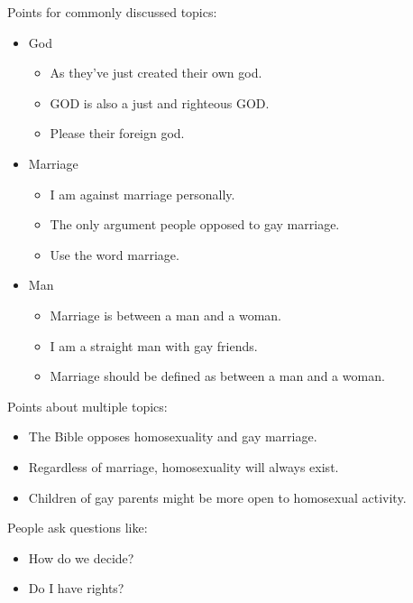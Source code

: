\documentclass[tikz]{article}
\begin{document}
\begin{multicols}{2}
    Points for commonly discussed topics:
    \begin{itemize}[noitemsep,nolistsep,label={}]
      \item{God}
        \begin{itemize}[noitemsep,nolistsep,label={}]
          \item{As they've just created their own god.}
          \item{GOD is also a just and righteous GOD.}
          \item{Please their foreign god.}
        \end{itemize}
      \item{Marriage}
        \begin{itemize}[noitemsep,nolistsep,label={}]
          \item{I am against marriage personally.}
          \item{The only argument people opposed to gay marriage.}
          \item{Use the word marriage.}
        \end{itemize}
      \item{Man}
        \begin{itemize}[noitemsep,nolistsep,label={}]
          \item{Marriage is between a man and a woman.}
          \item{I am a straight man with gay friends.}
          \item{Marriage should be defined as between a man and a woman.}
        \end{itemize}
    \end{itemize}

    Points about multiple topics:
    \begin{itemize}[noitemsep,nolistsep,label={}]
      \item{The Bible opposes homosexuality and gay marriage.}
      \item{Regardless of marriage, homosexuality will always exist.}
      \item{Children of gay parents might be more open to homosexual activity.}
    \end{itemize}

    People ask questions like:
    \begin{itemize}[noitemsep,nolistsep,label={}]
      \item{How do we decide?}
      \item{Do I have rights?}
    \end{itemize}


\end{multicols}
\end{document}
